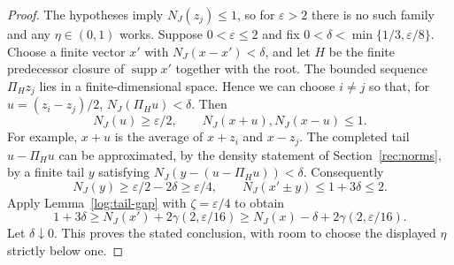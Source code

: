 \begin{proof}
The hypotheses imply $N_J(z_j)\le1$, so for $\varepsilon>2$ there
is no such family and any $\eta\in(0,1)$ works.  Suppose
$0<\varepsilon\le2$ and fix
$0<\delta<\min\{1/3,\varepsilon/8\}$.  Choose a finite vector $x'$
with $N_J(x-x')<\delta$, and let $H$ be the finite predecessor
closure of $\operatorname{supp}x'$ together with the root.  The bounded sequence $\Pi_H z_j$ lies in a finite-dimensional
space.  Hence we can choose $i\ne j$ so that, for
$u=(z_i-z_j)/2$, $N_J(\Pi_Hu)<\delta$.  Then
\[
 N_J(u)\ge\varepsilon/2,
 \qquad N_J(x+u),N_J(x-u)\le1.
\]
For example, $x+u$ is the average of $x+z_i$ and $x-z_j$.
The completed tail $u-\Pi_Hu$ can be approximated, by the density
statement of Section~\ref{rec:norms}, by a finite tail $y$ satisfying
$N_J(y-(u-\Pi_Hu))<\delta$.  Consequently
\[
 N_J(y)\ge\varepsilon/2-2\delta\ge\varepsilon/4,
 \qquad N_J(x'\pm y)\le1+3\delta\le2.
\]
Apply Lemma~\ref{log:tail-gap} with $\zeta=\varepsilon/4$ to obtain
\[
 1+3\delta\ge N_J(x')+2\gamma(2,\varepsilon/16)
 \ge N_J(x)-\delta+2\gamma(2,\varepsilon/16).
\]
Let $\delta\downarrow0$.  This proves the stated conclusion, with
room to choose the displayed $\eta$ strictly below one.
\end{proof}
